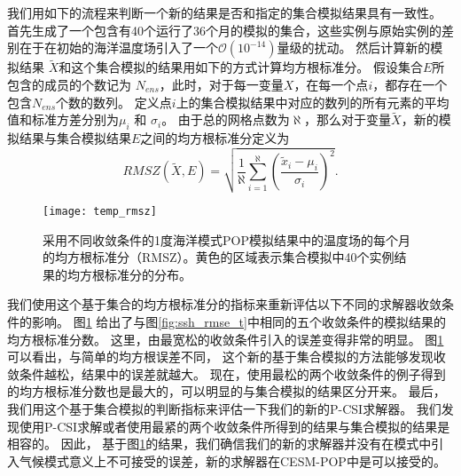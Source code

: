  
我们用如下的流程来判断一个新的结果是否和指定的集合模拟结果具有一致性。 
首先生成了一个包含有40个运行了36个月的模拟的集合，这些实例与原始实例的差别在于在初始的海洋温度场引入了一个$\mathcal{O}(10^{-14})$量级的扰动。 
然后计算新的模拟结果 $\tilde{{X}}$和这个集合模拟的结果用如下的方式计算均方根标准分。 
假设集合$E$所包含的成员的个数记为 $N_{ens}$，此时，对于每一变量$X$，在每一个点$i$，都存在一个包含$N_{ens}$个数的数列。
定义点$i$上的集合模拟结果中对应的数列的所有元素的平均值和标准方差分别为$\mu_i$ 和 $\sigma_i$。 
由于总的网格点数为$\aleph$，那么对于变量$\tilde{{X}}$，新的模拟结果与集合模拟结果$E$之间的均方根标准分定义为
\begin{equation}
 RMSZ(\tilde{X}, E) = \sqrt{\frac{1}{\aleph}\sum_{i=1}^\aleph(\frac{\tilde{x}_i -\mu_i}{\sigma_i})^2}. 
\label{e:rmsz}
\end{equation}


\begin{figure}%
\begin{center}
\texttt{[image: temp\_rmsz]}
\end{center}
\caption[] {采用不同收敛条件的1度海洋模式POP模拟结果中的温度场的每个月的均方根标准分（RMSZ）。黄色的区域表示集合模拟中40个实例结果的均方根标准分的分布。 }
\label{fig:ssh_rmsz_t}
\end{figure}

我们使用这个基于集合的均方根标准分的指标来重新评估以下不同的求解器收敛条件的影响。
图\ref{fig:ssh_rmsz_t} 给出了与图\ref{fig:ssh_rmse_t}中相同的五个收敛条件的模拟结果的均方根标准分数。
这里，由最宽松的收敛条件引入的误差变得非常的明显。  
图\ref{fig:ssh_rmsz_t} 可以看出，与简单的均方根误差不同， 这个新的基于集合模拟的方法能够发现收敛条件越松，结果中的误差就越大。 
现在，使用最松的两个收敛条件的例子得到的均方根标准分数也是最大的，可以明显的与集合模拟的结果区分开来。 
最后，我们用这个基于集合模拟的判断指标来评估一下我们的新的P-CSI求解器。 我们发现使用P-CSI求解或者使用最紧的两个收敛条件所得到的结果与集合模拟的结果是相容的。 
因此， 基于图\ref{fig:ssh_rmsz_t}的结果，我们确信我们的新的求解器并没有在模式中引入气候模式意义上不可接受的误差，新的求解器在CESM-POP中是可以接受的。  
 
